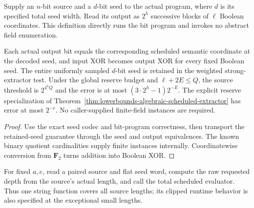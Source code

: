 \begin{definition}
  \label{def:lowerbounds-algebraic-scheduled-boolean}
  \leanok
  Supply an $n$-bit source and a $d$-bit seed to the actual program, where
  $d$ is its specified total seed width. Read its output as $2^h$ successive
  blocks of $\ell$ Boolean coordinates. This definition directly runs the
  bit program and invokes no abstract field enumeration.
\end{definition}

\begin{theorem}
  \label{thm:lowerbounds-algebraic-scheduled-boolean}
  \leanok
  Each actual output bit equals the corresponding scheduled semantic
  coordinate at the decoded seed, and input XOR becomes output XOR for
  every fixed Boolean seed. The entire uniformly sampled $d$-bit seed is
  retained in the weighted strong-extractor test. Under the global reserve
  budget and $\ell+2E\le Q$, the source threshold is $2^{4^hQ}$ and the
  error is at most $(3\cdot2^h-1)2^{-E}$. The explicit reserve specialization
  of Theorem~\ref{thm:lowerbounds-algebraic-scheduled-extractor} has error
  at most $2^{-e}$. No caller-supplied finite-field instances are required.
\end{theorem}
\begin{proof}
  \leanok
  Use the exact seed codec and bit-program correctness, then transport
  the retained-seed guarantee through the seed and output equivalences.
  The known binary quotient cardinalities supply finite instances internally.
  Coordinatewise conversion from $\mathbf F_2$ turns addition into Boolean XOR.
\end{proof}

\begin{definition}
  \label{def:lowerbounds-algebraic-polylog-program}
  \leanok
  For fixed $a,e$, read a paired source and flat seed word, compute the
  raw requested depth from the source's actual length, and call the total
  scheduled evaluator. Thus one string function covers all source lengths;
  its clipped runtime behavior is also specified at the exceptional small
  lengths.
\end{definition}

